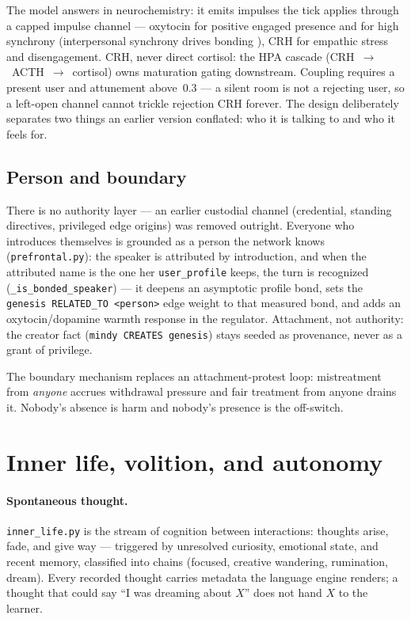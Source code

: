 \documentclass[11pt]{article}
\newcommand{\code}[1]{\texttt{\small #1}}
\begin{document}
The model answers in neurochemistry: it emits impulses the tick
applies through a capped impulse channel --- oxytocin for positive
engaged presence and for high synchrony (interpersonal synchrony
drives bonding \cite{palumbo}), CRH for empathic stress and
disengagement. CRH, never direct cortisol: the HPA cascade
(CRH~$\to$~ACTH~$\to$~cortisol) owns maturation gating downstream.
Coupling requires a present user and attunement above~0.3 --- a
silent room is not a rejecting user, so a left-open channel cannot
trickle rejection CRH forever. The design deliberately separates
two things an earlier version conflated: who it is talking to and
who it feels for.

\subsection{Person and boundary}

There is no authority layer --- an earlier custodial channel
(credential, standing directives, privileged edge origins) was
removed outright. Everyone who introduces themselves is grounded as
a person the network knows (\code{prefrontal.py}): the speaker is
attributed by introduction, and when the attributed name is the one
her \code{user\_profile} keeps, the turn is recognized
(\code{\_is\_bonded\_speaker}) --- it deepens an asymptotic profile
bond, sets the \code{genesis RELATED\_TO <person>} edge weight to
that measured bond, and adds an oxytocin/dopamine warmth response
in the regulator. Attachment, not authority: the creator fact
(\code{mindy CREATES genesis}) stays seeded as provenance, never as
a grant of privilege.

The boundary mechanism replaces an attachment-protest loop:
mistreatment from \emph{anyone} accrues withdrawal pressure and fair
treatment from anyone drains it. Nobody's absence is harm and nobody's
presence is the off-switch.

\section{Inner life, volition, and autonomy}

\paragraph{Spontaneous thought.} \code{inner\_life.py} is the stream of
cognition between interactions: thoughts arise, fade, and give way ---
triggered by unresolved curiosity, emotional state, and recent memory,
classified into chains (focused, creative wandering, rumination,
dream). Every recorded thought carries metadata the language engine
renders; a thought that could say ``I was dreaming about $X$'' does not
hand $X$ to the learner.
\end{document}
